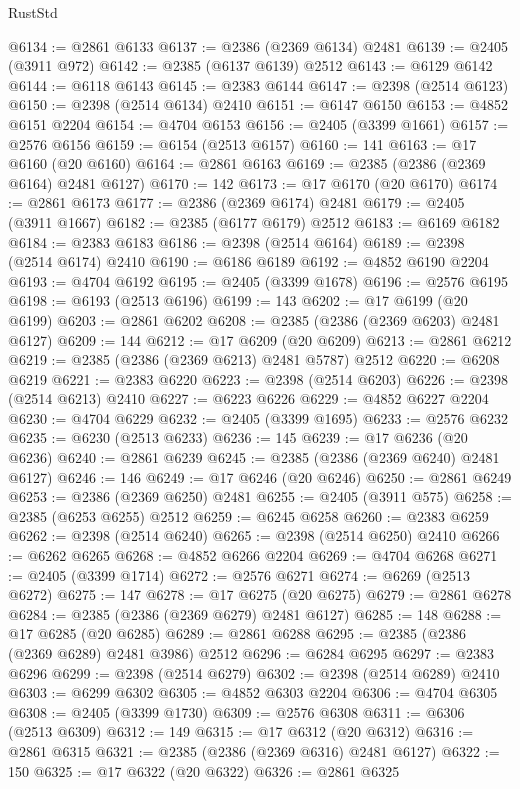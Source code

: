 \begin{lexlean}{RustStd}
\begin{coremodule}
{\begin{coremodule}
{{{{{{{{{{{{{{{{{{{{{{{{{{{{{{{{{{{{{{{{{{{{{{{{{{@6134 := @2861 @6133
@6137 := @2386 (@2369 @6134) @2481
@6139 := @2405 (@3911 @972)
@6142 := @2385 (@6137 @6139) @2512
@6143 := @6129 @6142
@6144 := @6118 @6143
@6145 := @2383 @6144
@6147 := @2398 (@2514 @6123)
@6150 := @2398 (@2514 @6134) @2410
@6151 := @6147 @6150
@6153 := @4852 @6151 @2204
@6154 := @4704 @6153
@6156 := @2405 (@3399 @1661)
@6157 := @2576 @6156
@6159 := @6154 (@2513 @6157)
@6160 := 141
@6163 := @17 @6160 (@20 @6160)
@6164 := @2861 @6163
@6169 := @2385 (@2386 (@2369 @6164) @2481 @6127)
@6170 := 142
@6173 := @17 @6170 (@20 @6170)
@6174 := @2861 @6173
@6177 := @2386 (@2369 @6174) @2481
@6179 := @2405 (@3911 @1667)
@6182 := @2385 (@6177 @6179) @2512
@6183 := @6169 @6182
@6184 := @2383 @6183
@6186 := @2398 (@2514 @6164)
@6189 := @2398 (@2514 @6174) @2410
@6190 := @6186 @6189
@6192 := @4852 @6190 @2204
@6193 := @4704 @6192
@6195 := @2405 (@3399 @1678)
@6196 := @2576 @6195
@6198 := @6193 (@2513 @6196)
@6199 := 143
@6202 := @17 @6199 (@20 @6199)
@6203 := @2861 @6202
@6208 := @2385 (@2386 (@2369 @6203) @2481 @6127)
@6209 := 144
@6212 := @17 @6209 (@20 @6209)
@6213 := @2861 @6212
@6219 := @2385 (@2386 (@2369 @6213) @2481 @5787) @2512
@6220 := @6208 @6219
@6221 := @2383 @6220
@6223 := @2398 (@2514 @6203)
@6226 := @2398 (@2514 @6213) @2410
@6227 := @6223 @6226
@6229 := @4852 @6227 @2204
@6230 := @4704 @6229
@6232 := @2405 (@3399 @1695)
@6233 := @2576 @6232
@6235 := @6230 (@2513 @6233)
@6236 := 145
@6239 := @17 @6236 (@20 @6236)
@6240 := @2861 @6239
@6245 := @2385 (@2386 (@2369 @6240) @2481 @6127)
@6246 := 146
@6249 := @17 @6246 (@20 @6246)
@6250 := @2861 @6249
@6253 := @2386 (@2369 @6250) @2481
@6255 := @2405 (@3911 @575)
@6258 := @2385 (@6253 @6255) @2512
@6259 := @6245 @6258
@6260 := @2383 @6259
@6262 := @2398 (@2514 @6240)
@6265 := @2398 (@2514 @6250) @2410
@6266 := @6262 @6265
@6268 := @4852 @6266 @2204
@6269 := @4704 @6268
@6271 := @2405 (@3399 @1714)
@6272 := @2576 @6271
@6274 := @6269 (@2513 @6272)
@6275 := 147
@6278 := @17 @6275 (@20 @6275)
@6279 := @2861 @6278
@6284 := @2385 (@2386 (@2369 @6279) @2481 @6127)
@6285 := 148
@6288 := @17 @6285 (@20 @6285)
@6289 := @2861 @6288
@6295 := @2385 (@2386 (@2369 @6289) @2481 @3986) @2512
@6296 := @6284 @6295
@6297 := @2383 @6296
@6299 := @2398 (@2514 @6279)
@6302 := @2398 (@2514 @6289) @2410
@6303 := @6299 @6302
@6305 := @4852 @6303 @2204
@6306 := @4704 @6305
@6308 := @2405 (@3399 @1730)
@6309 := @2576 @6308
@6311 := @6306 (@2513 @6309)
@6312 := 149
@6315 := @17 @6312 (@20 @6312)
@6316 := @2861 @6315
@6321 := @2385 (@2386 (@2369 @6316) @2481 @6127)
@6322 := 150
@6325 := @17 @6322 (@20 @6322)
@6326 := @2861 @6325
}}}}}}}}}}}}}}}}}}}}}}}}}}}}}}}}}}}}}}}}}}}}}}}}}}
\end{coremodule}}
\end{coremodule}
\end{lexlean}
